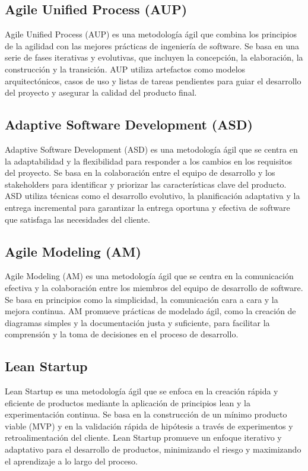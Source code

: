 \subsection{Agile Unified Process (AUP)}
	Agile Unified Process (AUP) es una metodología ágil que combina los principios de la agilidad con las mejores prácticas de ingeniería de software. Se basa en una serie de fases iterativas y evolutivas, que incluyen la concepción, la elaboración, la construcción y la transición. AUP utiliza artefactos como modelos arquitectónicos, casos de uso y listas de tareas pendientes para guiar el desarrollo del proyecto y asegurar la calidad del producto final.

\subsection{Adaptive Software Development (ASD)}
	Adaptive Software Development (ASD) es una metodología ágil que se centra en la
	adaptabilidad y la flexibilidad para responder a los cambios en los requisitos del proyecto. Se basa en la colaboración entre el equipo de desarrollo y los stakeholders para identificar y priorizar las características clave del producto. ASD utiliza técnicas como el desarrollo evolutivo, la planificación adaptativa y la entrega incremental para garantizar la entrega oportuna y efectiva de software que satisfaga las necesidades del cliente.

\subsection{Agile Modeling (AM)}
	Agile Modeling (AM) es una metodología ágil que se centra en la comunicación efectiva y la colaboración entre los miembros del equipo de desarrollo de software. Se basa en principios como la simplicidad, la comunicación cara a cara y la mejora continua. AM promueve prácticas de modelado ágil, como la creación de diagramas simples y la documentación justa y suficiente, para facilitar la comprensión y la toma de decisiones en el proceso de desarrollo.

\subsection{Lean Startup}
	Lean Startup es una metodología ágil que se enfoca en la creación rápida y eficiente de productos mediante la aplicación de principios lean y la experimentación continua. Se basa en la construcción de un mínimo producto viable (MVP) y en la validación rápida de hipótesis a través de experimentos y retroalimentación del cliente. Lean Startup promueve un enfoque iterativo y adaptativo para el desarrollo de productos, minimizando el riesgo y maximizando el aprendizaje a lo largo del proceso.

